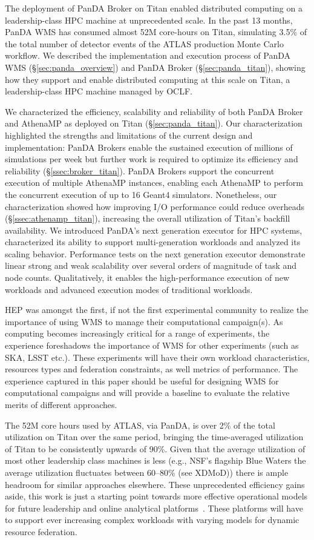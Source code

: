 The deployment of PanDA Broker on Titan enabled distributed computing on a
leadership-class HPC machine at unprecedented scale. In the past 13 months,
PanDA WMS has consumed almost 52M core-hours on Titan, simulating 3.5\% of
the total number of detector events of the ATLAS production Monte Carlo
workflow. We described the implementation and execution process of PanDA WMS
(\S\ref{sec:panda_overview}) and PanDA Broker (\S\ref{sec:panda_titan}),
showing how they support and enable distributed computing at this scale on
Titan, a leadership-class HPC machine managed by OCLF.

We characterized the efficiency, scalability and reliability of both PanDA
Broker and AthenaMP as deployed on Titan (\S\ref{sec:panda_titan}). Our
characterization highlighted the strengths and limitations of the current
design and implementation: PanDA Brokers enable the sustained execution of
millions of simulations per week but further work is required to optimize its
efficiency and reliability (\S\ref{ssec:broker_titan}). PanDA Brokers support
the concurrent execution of multiple AthenaMP instances, enabling each
AthenaMP to perform the concurrent execution of up to 16 Geant4 simulators.
Nonetheless, our characterization showed how improving I/O performance could
reduce overheads (\S\ref{ssec:athenamp_titan}), increasing the overall
utilization of Titan's backfill availability. We introduced PanDA's next
generation executor for HPC systems, characterized its ability to support
multi-generation workloads and analyzed its scaling behavior.  Performance
tests on the next generation executor demonstrate linear strong and weak
scalability over several orders of magnitude  of task and node counts.
Qualitatively, it enables the high-performance execution of new workloads and
advanced execution modes of traditional workloads.

HEP was amongst the first, if not the first experimental community to realize
the importance of using WMS to manage their computational campaign(s). As
computing becomes increasingly critical for a range of experiments, the
experience foreshadows the importance of WMS for other experiments (such as
SKA, LSST etc.).  These experiments will have their own workload
characteristics, resources types and federation constraints, as well metrics
of performance. The experience captured in this paper should be useful for
designing WMS for computational campaigns and will provide a baseline to
evaluate the relative merits of different approaches.

The 52M core hours used by ATLAS, via PanDA, is over 2\% of the total
utilization on Titan over the same period, bringing the time-averaged
utilization of Titan to be consistently upwards of 90\%. Given that the
average utilization of most other leadership class machines is less (e.g.,
NSF's flagship Blue Waters the average utilization fluctuates between
60--80\% (see XDMoD\cite{bw-sucks})) there is ample headroom for similar
approaches elsewhere. These unprecedented efficiency gains aside, this work
is just a starting point towards more effective operational models for future
leadership and online analytical platforms~\cite{foap-url}. These platforms
will have to support ever increasing complex workloads with varying models
for dynamic resource federation.

